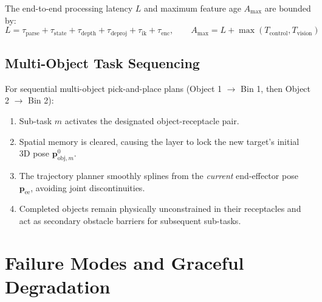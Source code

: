 \documentclass[10pt,a4paper]{article}
\begin{document}
The end-to-end processing latency $L$ and maximum feature age $A_{\max}$ are bounded by:
\begin{equation}
L = \tau_{\mathrm{parse}} + \tau_{\mathrm{state}} + \tau_{\mathrm{depth}} + \tau_{\mathrm{deproj}} + \tau_{\mathrm{ik}} + \tau_{\mathrm{enc}}, \qquad A_{\max} = L + \max(T_{\mathrm{control}}, T_{\mathrm{vision}})
\end{equation}

\subsection{Multi-Object Task Sequencing}
For sequential multi-object pick-and-place plans (Object 1 $\rightarrow$ Bin 1, then Object 2 $\rightarrow$ Bin 2):
\begin{enumerate}
    \item Sub-task $m$ activates the designated object-receptacle pair.
    \item Spatial memory is cleared, causing the layer to lock the new target's initial 3D pose $\mathbf{p}_{\mathrm{obj}, m}^0$.
    \item The trajectory planner smoothly splines from the \emph{current} end-effector pose $\mathbf{p}_{\mathrm{ee}}$, avoiding joint discontinuities.
    \item Completed objects remain physically unconstrained in their receptacles and act as secondary obstacle barriers for subsequent sub-tasks.
\end{enumerate}

\section{Failure Modes and Graceful Degradation}
\end{document}
